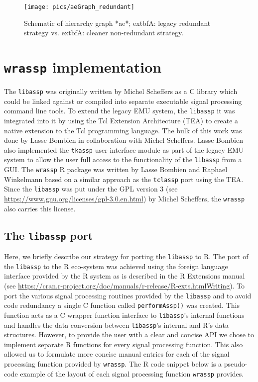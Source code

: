 \documentclass[]{book}
\begin{document}
\begin{figure}

{\centering \texttt{[image: pics/aeGraph\_redundant]} 

}

\caption{Schematic of hierarchy graph *ae*;     extbf{A}: legacy redundant strategy vs.     extbf{A}: cleaner non-redundant strategy.}\label{fig:query-redundant}
\end{figure}

\hypertarget{chap:wrassp_impl}{%
\chapter{\texorpdfstring{\texttt{wrassp} implementation}{wrassp implementation}}\label{chap:wrassp_impl}}

The \texttt{libassp} was originally written by Michel Scheffers as a C library which could be linked against or compiled into separate executable signal processing command line tools. To extend the legacy EMU system, the \texttt{libassp} it was integrated into it by using the Tcl Extension Architecture (TEA) to create a native extension to the Tcl programming language. The bulk of this work was done by Lasse Bombien in collaboration with Michel Scheffers. Lasse Bombien also implemented the \texttt{tkassp} user interface module as part of the legacy EMU system to allow the user full access to the functionality of the \texttt{libassp} from a GUI. The \texttt{wrassp} R package was written by Lasse Bombien and Raphael Winkelmann based on a similar approach as the \texttt{tclassp} port using the TEA. Since the \texttt{libassp} was put under the GPL version 3 (see \url{https://www.gnu.org/licenses/gpl-3.0.en.html}) by Michel Scheffers, the \texttt{wrassp} also carries this license.

\hypertarget{the-libassp-port}{%
\section{\texorpdfstring{The \texttt{libassp} port}{The libassp port}}\label{the-libassp-port}}

Here, we briefly describe our strategy for porting the \texttt{libassp} to R. The port of the \texttt{libassp} to the R eco-system was achieved using the foreign language interface provided by the R system as is described in the R Extensions manual (see \url{https://cran.r-project.org/doc/manuals/r-release/R-exts.htmlWriting}). To port the various signal processing routines provided by the \texttt{libassp} and to avoid code redundancy a single C function called \texttt{performAssp()} was created. This function acts as a C wrapper function interface to \texttt{libassp}'s internal functions and handles the data conversion between \texttt{libassp}'s internal and R's data structures. However, to provide the user with a clear and concise API we chose to implement separate R functions for every signal processing function. This also allowed us to formulate more concise manual entries for each of the signal processing function provided by \texttt{wrassp}. The R code snippet below is a pseudo-code example of the layout of each signal processing function \texttt{wrassp} provides.
\end{document}
